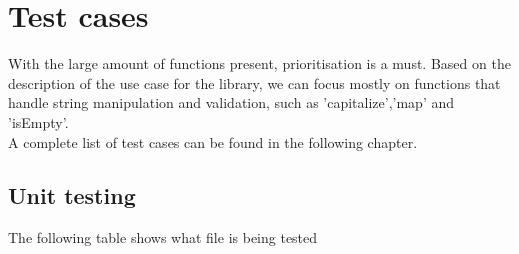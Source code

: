 \documentclass[a4paper, 12pt]{article}
\begin{document}
\section{Test cases}
With the large amount of functions present, prioritisation is a must.
Based on the description of the use case for the library, we can focus mostly on functions that handle string manipulation and validation,
such as 'capitalize','map' and 'isEmpty'.
\\
 A complete list of test cases can be found in the following chapter.


\subsection{Unit testing}

The following table shows what file is being tested
\end{document}
